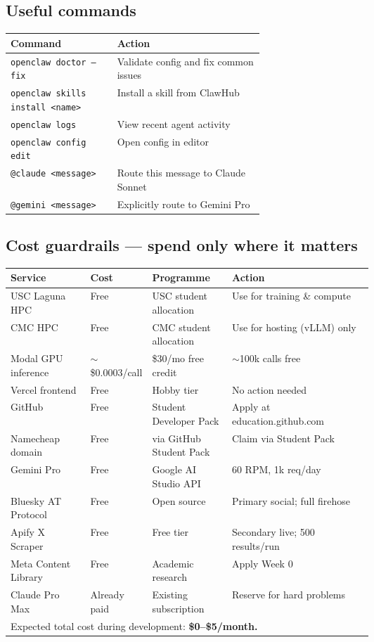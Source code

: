 \documentclass[11pt]{article}
\begin{document}
\subsection*{Useful commands}

\begin{center}
\begin{tabularx}{\linewidth}{p{0.42\linewidth}X}
\toprule
\textbf{Command} & \textbf{Action} \\
\midrule
\texttt{openclaw doctor --fix} & Validate config and fix common issues \\
\texttt{openclaw skills install <name>} & Install a skill from ClawHub \\
\texttt{openclaw logs} & View recent agent activity \\
\texttt{openclaw config edit} & Open config in editor \\
\texttt{@claude <message>} & Route this message to Claude Sonnet \\
\texttt{@gemini <message>} & Explicitly route to Gemini Pro \\
\bottomrule
\end{tabularx}
\end{center}

\subsection*{Cost guardrails --- spend only where it matters}

\begin{center}
\begin{tabularx}{\linewidth}{p{0.22\linewidth}p{0.16\linewidth}p{0.22\linewidth}X}
\toprule
\textbf{Service} & \textbf{Cost} & \textbf{Programme} & \textbf{Action} \\
\midrule
USC Laguna HPC & Free & USC student allocation & Use for training \& compute \\
CMC HPC & Free & CMC student allocation & Use for hosting (vLLM) only \\
Modal GPU inference & $\sim$\$0.0003/call & \$30/mo free credit & $\sim$100k calls free \\
Vercel frontend & Free & Hobby tier & No action needed \\
GitHub & Free & Student Developer Pack & Apply at education.github.com \\
Namecheap domain & Free & via GitHub Student Pack & Claim via Student Pack \\
Gemini Pro & Free & Google AI Studio API & 60 RPM, 1k req/day \\
Bluesky AT Protocol & Free & Open source & Primary social; full firehose \\
Apify X Scraper & Free & Free tier & Secondary live; 500 results/run \\
Meta Content Library & Free & Academic research & Apply Week 0 \\
Claude Pro Max & Already paid & Existing subscription & Reserve for hard problems \\
\bottomrule
\multicolumn{4}{l}{\small Expected total cost during development: \textbf{\$0--\$5/month.}} \\
\end{tabularx}
\end{center}
\end{document}
